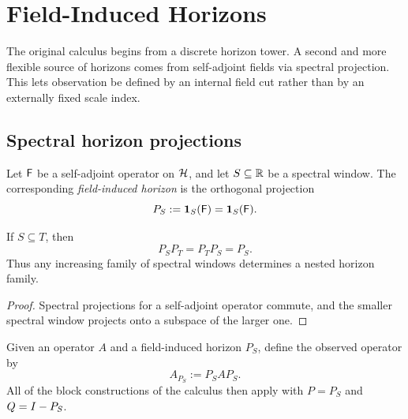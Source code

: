 \section{Field-Induced Horizons}
\label{sec:field-induced-horizons}

The original calculus begins from a discrete horizon tower. A second and more
flexible source of horizons comes from self-adjoint fields via spectral
projection. This lets observation be defined by an internal field cut rather
than by an externally fixed scale index.

\subsection{Spectral horizon projections}
\label{subsec:field-induced-horizons}

\begin{definition}
\label{def:field-induced-horizon}
Let $\mathsf{F}$ be a self-adjoint operator on $\mathcal{H}$, and let $S \subseteq \mathbb{R}$
be a spectral window. The corresponding \emph{field-induced horizon} is the
orthogonal projection
\[
P_S := \mathbf{1}_{S}(\mathsf{F}) = \mathbf{1}_S(\mathsf{F}).
\]
\end{definition}

\begin{proposition}
\label{prop:field-induced-nesting}
If $S \subseteq T$, then
\[
P_S P_T = P_T P_S = P_S.
\]
Thus any increasing family of spectral windows determines a nested horizon
family.
\end{proposition}

\begin{proof}
Spectral projections for a self-adjoint operator commute, and the smaller
spectral window projects onto a subspace of the larger one.
\end{proof}

\begin{definition}
\label{def:field-adapted-observable}
Given an operator $A$ and a field-induced horizon $P_S$, define the observed
operator by
\[
A_{P_S} := P_S A P_S.
\]
All of the block constructions of the calculus then apply with
$P = P_S$ and $Q = I - P_S$.
\end{definition}

